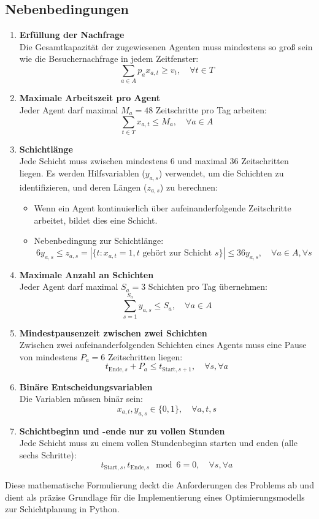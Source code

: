 \subsection*{Nebenbedingungen}
\begin{enumerate}
    \item \textbf{Erfüllung der Nachfrage}\\
          Die Gesamtkapazität der zugewiesenen Agenten muss mindestens so groß sein wie die Besuchernachfrage in jedem Zeitfenster:
          $$\sum_{a \in A} p_a x_{a,t} \geq v_t, \quad \forall t \in T$$
    \item \textbf{Maximale Arbeitszeit pro Agent}\\
          Jeder Agent darf maximal $M_a = 48$ Zeitschritte pro Tag arbeiten:
          $$\sum_{t \in T} x_{a,t} \leq M_a, \quad \forall a \in A$$
    \item \textbf{Schichtlänge}\\
          Jede Schicht muss zwischen mindestens 6 und maximal 36 Zeitschritten liegen. Es werden Hilfsvariablen ($y_{a,s}$) verwendet, um die Schichten zu identifizieren, und deren Längen ($z_{a,s}$) zu berechnen:
          \begin{itemize}
              \item Wenn ein Agent kontinuierlich über aufeinanderfolgende Zeitschritte arbeitet, bildet dies eine Schicht.
              \item Nebenbedingung zur Schichtlänge: $$6y_{a,s} \leq z_{a,s} = |\{t: x_{a,t}=1, t\text{ gehört zur Schicht }s\}| \leq 36y_{a,s},\quad\forall a\in A,\forall s$$
          \end{itemize}
    \item \textbf{Maximale Anzahl an Schichten}\\
          Jeder Agent darf maximal $S_a = 3$ Schichten pro Tag übernehmen:
          $$\sum_{s=1}^{S_a} y_{a,s} \leq S_a,\quad\forall a\in A$$
    \item \textbf{Mindestpausenzeit zwischen zwei Schichten}\\
          Zwischen zwei aufeinanderfolgenden Schichten eines Agents muss eine Pause von mindestens $P_a = 6$ Zeitschritten liegen:
          $$t_{\text{Ende},s} + P_a \leq t_{\text{Start},s+1},\quad\forall s,\forall a$$
    \item \textbf{Binäre Entscheidungsvariablen}\\
          Die Variablen müssen binär sein:
          $$x_{a,t}, y_{a,s} \in \{0,1\},\quad\forall a,t,s$$
    \item \textbf{Schichtbeginn und -ende nur zu vollen Stunden}\\
          Jede Schicht muss zu einem vollen Stundenbeginn starten und enden (alle sechs Schritte):
          $$t_{\text{Start},s}, t_{\text{Ende},s} \mod 6 = 0,\quad\forall s,\forall a$$
\end{enumerate}

Diese mathematische Formulierung deckt die Anforderungen des Problems ab und dient als präzise Grundlage für die Implementierung eines Optimierungsmodells zur Schichtplanung in Python.
